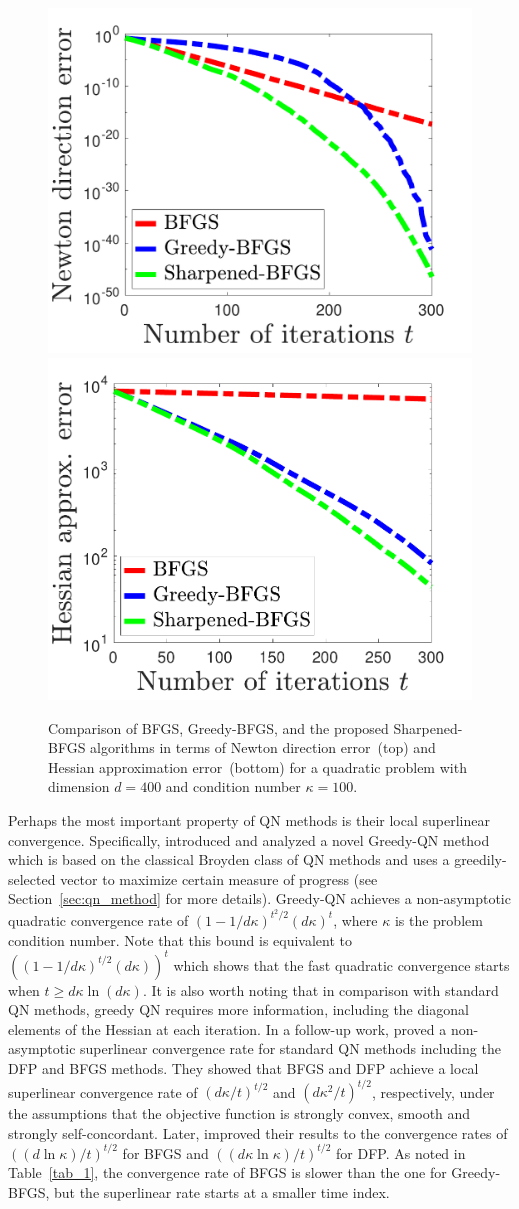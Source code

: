 \documentclass[11pt]{article}
\numberwithin{assumption}{section}
\numberwithin{remark}{section}
\numberwithin{theorem}{section}
\begin{document}
\begin{figure}
  \centering
    \includegraphics[width=0.45\linewidth]{Figures/hybrid_direction.pdf}\qquad
    \includegraphics[width=0.45\linewidth]{Figures/hybrid_matrix.pdf}
  \vspace{-2mm}
  \caption{Comparison of BFGS, Greedy-BFGS, and the proposed Sharpened-BFGS algorithms in terms of Newton direction error~(top) and Hessian approximation error~(bottom) for a quadratic problem with dimension $d=400$ and condition number $\kappa=100$.}
  \label{toy_example}
\end{figure}

Perhaps the most important property of QN methods is their local superlinear convergence. Specifically, \citet{rodomanov2020greedy} introduced and analyzed a novel Greedy-QN method which is based on the classical Broyden class of QN methods and uses a greedily-selected vector to maximize certain measure of progress (see Section~\ref{sec:qn_method} for more details). Greedy-QN achieves a non-asymptotic quadratic convergence rate of $(1 - {1}/{d\kappa})^{t^2/2}(d\kappa)^t$, where $\kappa$ is the problem condition number. Note that this bound is equivalent to $((1 - {1}/{d\kappa})^{t/2}(d\kappa))^t$ which
shows that the fast quadratic convergence starts when $t\geq d\kappa \ln (d\kappa)$. It is also worth noting that in comparison with standard QN methods, greedy QN requires more information, including the diagonal elements of the Hessian at each iteration. 
In a follow-up work,  \citet{rodomanov2020rates} proved a non-asymptotic superlinear convergence rate for standard QN methods including the DFP and BFGS methods. They showed that BFGS and DFP achieve a local superlinear convergence rate of $({d\kappa}/{t})^{t/2}$ and $({d\kappa^2}/{t})^{t/2}$, respectively, under the assumptions that the objective function is strongly convex, smooth and strongly self-concordant. Later, \citet{rodomanov2020ratesnew} improved their results to the convergence rates of $({(d\ln{\kappa})}/{t})^{{t}/{2}}$ for BFGS and $({(d\kappa\ln{\kappa})}/{t})^{{t}/{2}}$ for DFP.  As noted in Table~\ref{tab_1}, the convergence rate of BFGS is slower than the one for Greedy-BFGS, but the superlinear rate starts at a smaller time index. 
\end{document}
